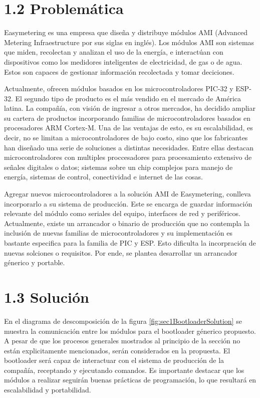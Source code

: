 \documentclass[
11pt, %
]{charter}
\begin{document}
\newpage

\section{1.2 Problemática}
\label{sec:s1Problematica}

Easymetering es una empresa que diseña y distribuye módulos AMI (Advanced Metering Infraestructure por sus siglas en inglés). Los módulos AMI son sistemas que miden, recolectan y analizan el uso de la energía, e interactúan con dispositivos como los medidores inteligentes de electricidad, de gas o de agua. Estos son capaces de gestionar información recolectada y tomar deciciones.

Actualmente, ofrecen módulos basados en los microcontroladores PIC-32 y ESP-32. El segundo tipo de producto es el más vendido en el mercado de América latina. La compañía, con visión de ingresar a otros mercados, ha decidido ampliar su cartera de productos incorporando familias de microcontroladores basados en procesadores ARM Cortex-M. Una de las ventajas de esto, es su escalabilidad, es decir, no se limitan a microcontroladores de bajo costo, sino que los fabricantes han diseñado una serie de soluciones a distintas necesidades. Entre ellas destacan microcontroladores con multiples proccesadores para procesamiento extensivo de señales digitales o datos; sistemas sobre un chip complejos para manejo de energía, sistemas de control, conectividad e internet de las cosas.

Agregar nuevos microcontroladores a la solución AMI de Easymetering, conlleva incorporarlo a su sistema de producción. Este se encarga de guardar información relevante del módulo como seriales del equipo, interfaces de red y periféricos. Actualmente, existe un arrancador o binario de producción que no contempla la inclusión de nuevas familias de microcontroladores y su implementación es bastante especifica para la familia de PIC y ESP. Esto dificulta la incorpración de nuevas solciones o requisitos.  Por ende, se plantea desarrollar un arrancador génerico y portable.

\section{1.3 Solución}
\label{sec:s1Solución}

En el diagrama de descomposición de la figura \ref{fig:sec1BootloaderSolution} se muestra la comunicación entre los módulos para el bootloader génerico propuesto. A pesar de que los procesos generales mostrados al principio de la sección no están explicitamente mencionados, serán considerados en la propuesta. El bootloader será capaz de interactuar con el sistema de producción de la compañía, receptando y ejecutando comandos. Es importante destacar que los módulos a realizar seguirán buenas prácticas de programación, lo que resultará en escalabilidad y portabilidad. 
\end{document}
